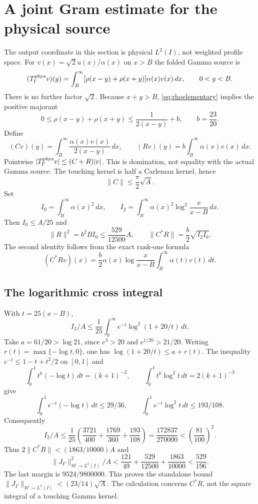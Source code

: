 \documentclass[11pt,a4paper]{article}
\numberwithin{equation}{section}
\theoremstyle{remark}\newtheorem{remark}[theorem]{Remark}
\newcommand{\norm}[1]{\lVert#1\rVert}\newcommand{\abs}[1]{\lvert#1\rvert}
\newcommand{\wo}{\mathcal W}\newcommand{\HS}{\mathrm{HS}}
\begin{document}
\section{A joint Gram estimate for the physical source}\label{sec:joint}
The output coordinate in this section is physical $L^2(I)$, not weighted profile space.
For $v(x)=\sqrt2u(x)/\alpha(x)$ on $x>B$ the folded Gamma source is
\[
 (T_\Gamma^{\rm phys}v)(y)=\int_B^\infty
 [\rho(x-y)+\rho(x+y)]\alpha(x)v(x)\,dx,\qquad0<y<B.
\]
There is no further factor $\sqrt2$.
Because $x+y>B$, \eqref{eq:rhoelementary} implies the positive majorant
\[
 0\le\rho(x-y)+\rho(x+y)\le\frac1{2(x-y)}+b,\qquad b=\frac{23}{20}.
\]
Define
\[
 (Cv)(y)=\int_B^\infty\frac{\alpha(x)v(x)}{2(x-y)}\,dx,\qquad
 (Rv)(y)=b\int_B^\infty\alpha(x)v(x)\,dx.
\]
Pointwise $|T_\Gamma^{\rm phys}v|\le(C+R)|v|$.
This is domination, not equality with the actual Gamma source.
The touching kernel is half a Carleman kernel, hence
\[
 \norm C\le\frac\pi2\sqrt A.
\]
Set
\[
 I_0=\int_B^\infty\alpha(x)^2\,dx,\qquad
 I_2=\int_B^\infty\alpha(x)^2\log^2\frac{x}{x-B}\,dx.
\]
Then $I_0\le A/25$ and
\begin{equation}\label{eq:regulargram}
 \norm R^2=b^2BI_0\le\frac{529}{12500}A,\qquad
 \norm{C^*R}=\frac b2\sqrt{I_2I_0}.
\end{equation}
The second identity follows from the exact rank-one formula
\[
 (C^*Rv)(x)=\frac b2\alpha(x)\log\frac{x}{x-B}
                  \int_B^\infty\alpha(t)v(t)\,dt.
\]

\subsection{The logarithmic cross integral}
With $t=25(x-B)$,
\[
 I_2/A\le\frac1{25}\int_0^\infty e^{-t}\log^2(1+20/t)\,dt.
\]
Take $a=61/20>\log21$, since $e^3>20$ and $e^{1/20}>21/20$.
Writing $r(t)=\max\{-\log t,0\}$, one has
$\log(1+20/t)\le a+r(t)$.
The inequality $e^{-t}\le1-t+t^2/2$ on $[0,1]$ and
\[
 \int_0^1t^k(-\log t)\,dt=(k+1)^{-2},\qquad
 \int_0^1t^k\log^2t\,dt=2(k+1)^{-3}
\]
give
\[
 \int_0^1e^{-t}(-\log t)\,dt\le29/36,\qquad
 \int_0^1e^{-t}\log^2t\,dt\le193/108.
\]
Consequently
\begin{equation}\label{eq:I2}
 I_2/A\le\frac1{25}\left(\frac{3721}{400}+
       \frac{1769}{360}+\frac{193}{108}\right)
 =\frac{172837}{270000}<\left(\frac{81}{100}\right)^2.
\end{equation}
Thus $2\norm{C^*R}<(1863/10000)A$ and
\begin{equation}\label{eq:gammajoint}
 \norm{J_\Gamma}_{\wo\to L^2(I)}^2/A
 <\frac{121}{49}+\frac{529}{12500}+\frac{1863}{10000}
 <\frac{529}{196}.
\end{equation}
The last margin is $9524/9800000$.
This proves the standalone bound
$\norm{J_\Gamma}_{\wo\to L^2(I)}<(23/14)\sqrt A$.
The calculation concerns $C^*R$, not the square integral of a touching Gamma kernel.
\end{document}
